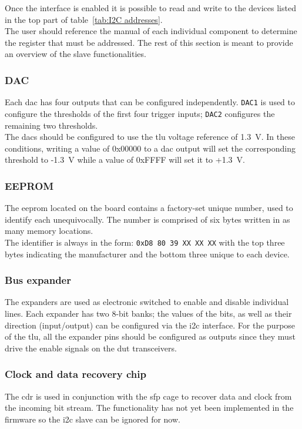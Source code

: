 Once the interface is enabled it is possible to read and write to the devices listed in the top part of table~\ref{tab:I2C addresses}.\\
The user should reference the manual of each individual component to determine the register that must be addressed. The rest of this section is meant to provide an overview of the slave functionalities.

\subsubsection{DAC}
Each \gls{dac} has four outputs that can be configured independently. \verb|DAC1| is used to configure the thresholds of the first four trigger inputs; \verb|DAC2| configures the remaining two thresholds.\\
The \gls{dac}s should be configured to use the \gls{tlu} voltage reference of 1.3~V. In these conditions, writing a value of 0x00000 to a \gls{dac} output will set the corresponding threshold to -1.3~V while a value of 0xFFFF will set it to +1.3~V.

\subsubsection{EEPROM}
The \gls{eeprom} located on the board contains a factory-set unique number, used to identify each \brd unequivocally. The number is comprised of six bytes written in as many memory locations.\\
The identifier is always in the form: \verb|0xD8 80 39 XX XX XX| with the top three bytes indicating the manufacturer and the bottom three unique to each device.

\subsubsection{Bus expander}
The expanders are used as electronic switched to enable and disable individual lines. Each expander has two 8-bit banks; the values of the bits, as well as their direction (input/output) can be configured via the \gls{i2c} interface. For the purpose of the \gls{tlu}, all the expander pins should be configured as outputs since they must drive the enable signals on the \gls{dut} transceivers.

\subsubsection{Clock and data recovery chip}
The \gls{cdr} is used in conjunction with the \gls{sfp} cage to recover data and clock from the incoming bit stream. The functionality has not yet been implemented in the firmware so the \gls{i2c} slave can be ignored for now.

